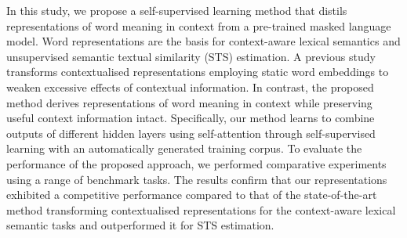 In this study, we propose a self-supervised learning method that distils representations of word meaning in context from a pre-trained masked language model. Word representations are the basis for context-aware lexical semantics and unsupervised semantic textual similarity (STS) estimation. A previous study transforms contextualised representations employing static word embeddings to weaken excessive effects of contextual information. In contrast, the proposed method derives representations of word meaning in context while preserving useful context information intact. Specifically, our method learns to combine outputs of different hidden layers using self-attention through self-supervised learning with an automatically generated training corpus. To evaluate the performance of the proposed approach, we performed comparative experiments using a range of benchmark tasks. The results confirm that our representations exhibited a competitive performance compared to that of the state-of-the-art method transforming contextualised representations for the context-aware lexical semantic tasks and outperformed it for STS estimation.
